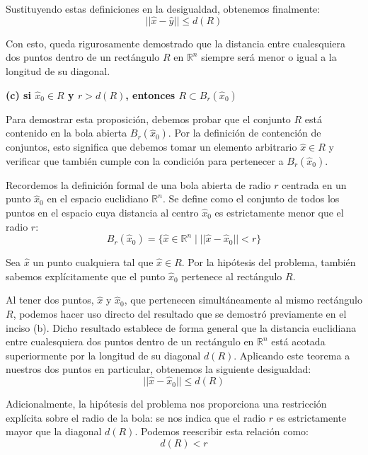 \documentclass[11pt,letterpaper]{article}
\begin{document}
Sustituyendo estas definiciones en la desigualdad, obtenemos finalmente:
\begin{equation*}
||\hat{x}-\hat{y}|| \le d(R)
\end{equation*}

Con esto, queda rigurosamente demostrado que la distancia entre cualesquiera dos puntos dentro de un rectángulo $R$ en $\mathbb{R}^{n}$ siempre será menor o igual a la longitud de su diagonal.

\textbf{(c) si $\hat{x}_{0}\in R$ y $r>d(R)$, entonces $R\subset B_{r}(\hat{x}_{0})$}

Para demostrar esta proposición, debemos probar que el conjunto $R$ está contenido en la bola abierta $B_{r}(\hat{x}_{0})$. Por la definición de contención de conjuntos, esto significa que debemos tomar un elemento arbitrario $\hat{x} \in R$ y verificar que también cumple con la condición para pertenecer a $B_{r}(\hat{x}_{0})$.

Recordemos la definición formal de una bola abierta de radio $r$ centrada en un punto $\hat{x}_{0}$ en el espacio euclidiano $\mathbb{R}^{n}$. Se define como el conjunto de todos los puntos en el espacio cuya distancia al centro $\hat{x}_{0}$ es estrictamente menor que el radio $r$:
\begin{equation*}
B_{r}(\hat{x}_{0}) = \{\hat{x} \in \mathbb{R}^{n} \mid ||\hat{x} - \hat{x}_{0}|| < r\}
\end{equation*}

Sea $\hat{x}$ un punto cualquiera tal que $\hat{x} \in R$. 
Por la hipótesis del problema, también sabemos explícitamente que el punto $\hat{x}_{0}$ pertenece al rectángulo $R$.

Al tener dos puntos, $\hat{x}$ y $\hat{x}_{0}$, que pertenecen simultáneamente al mismo rectángulo $R$, podemos hacer uso directo del resultado que se demostró previamente en el inciso (b). Dicho resultado establece de forma general que la distancia euclidiana entre cualesquiera dos puntos dentro de un rectángulo en $\mathbb{R}^{n}$ está acotada superiormente por la longitud de su diagonal $d(R)$. Aplicando este teorema a nuestros dos puntos en particular, obtenemos la siguiente desigualdad:
\begin{equation*}
||\hat{x} - \hat{x}_{0}|| \le d(R)
\end{equation*}

Adicionalmente, la hipótesis del problema nos proporciona una restricción explícita sobre el radio de la bola: se nos indica que el radio $r$ es estrictamente mayor que la diagonal $d(R)$. Podemos reescribir esta relación como:
\begin{equation*}
d(R) < r
\end{equation*}
\end{document}
